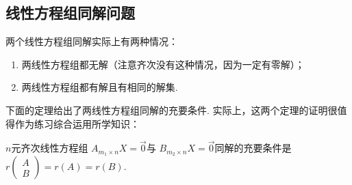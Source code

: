 \subsection{线性方程组同解问题}

两个线性方程组同解实际上有两种情况：
\begin{enumerate}
    \item 两线性方程组都无解（注意齐次没有这种情况，因为一定有零解）；

    \item 两线性方程组都有解且有相同的解集.
\end{enumerate}

下面的定理给出了两线性方程组同解的充要条件. 实际上，这两个定理的证明很值得作为练习综合运用所学知识：
\begin{theorem}{}{}
    $n$元齐次线性方程组 $A_{m_1 \times n}X=\vec{0}$与 $B_{m_2 \times n}X=\vec{0}$同解的充要条件是$r\begin{pmatrix}
            A \\ B
        \end{pmatrix}=r(A)=r(B)$.
\end{theorem}

